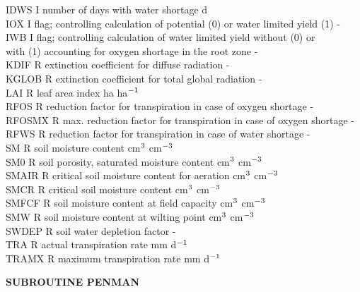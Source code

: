 \begin{tabbing}
IDWS\> \> I\> number of days with water shortage\> \> \> \> \> \> \> d\\
IOX\> \> I\> flag; controlling calculation of potential (0) or water limited yield (1) \> \> \> \> \> \> \> -\\
IWB\> \> I\> flag; controlling calculation of water limited yield without (0) or \\
\>\> \> with (1) accounting for oxygen shortage in the root zone\> \> \> \> \> \> \> -\\
KDIF\> \> R\> extinction coefficient for diffuse radiation\> \> \> \> \> \> \> -\\
KGLOB\> \> R\> extinction coefficient for total global radiation\> \> \> \> \> \> \> -\\
LAI\> \> R\> leaf area index\> \> \> \> \> \> \> ha ha$^{{\rm -1}}$\\
RFOS\> \> R\> reduction factor for transpiration in case of oxygen shortage\> \> \> \> \> \> \> -\\
RFOSMX\> \> R\> max. reduction factor for transpiration in case of oxygen shortage\> \> \> \> \> \> \> -\\
RFWS\> \> R\> reduction factor for transpiration in case of water shortage\> \> \> \> \> \> \> -\\
SM\> \> R\> soil moisture content\> \> \> \> \> \> \> cm$^{{\rm 3}}$ cm$^{{\rm -3}}$\\
SM0\> \> R\> soil porosity, saturated moisture content \> \> \> \> \> \> \> cm$^{{\rm 3}}$ cm$^{{\rm -3}}$\\
SMAIR\> \> R\> critical soil moisture content for aeration\> \> \> \> \> \> \> cm$^{{\rm 3}}$ cm$^{{\rm -3}}$\\
SMCR\> \> R \> critical soil moisture content\> \> \> \> \> \> \> cm$^{{\rm 3}}$ cm$^{{\rm -3}}$\\
SMFCF\> \> R\> soil moisture content at field capacity\> \> \> \> \> \> \> cm$^{{\rm 3}}$ cm$^{{\rm -3}}$\\
SMW\> \> R \> soil moisture content at wilting point\> \> \> \> \> \> \> cm$^{{\rm 3}}$ cm$^{{\rm -3}}$\\
SWDEP\> \> R\> soil water depletion factor\> \> \> \> \> \> \> -\\
TRA\> \> R\> actual transpiration rate\> \> \> \> \> \> \> mm d$^{{\rm -1}}$\\
TRAMX\> \> R\> maximum transpiration rate\> \> \> \> \> \> \> mm d$^{{\rm -1}}$
\end{tabbing}

\bigskip
\bigskip
\bigskip
\bigskip
{\bf SUBROUTINE PENMAN}
\testlastline

